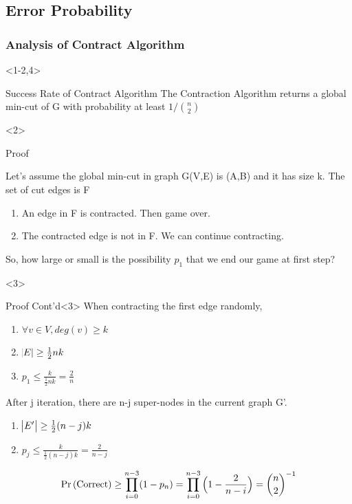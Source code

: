 \documentclass{beamer}
\begin{document}
\subsection{Error Probability}
\begin{frame}
\frametitle{Analysis of Contract Algorithm}
\begin{overlayarea}{\linewidth}{\textheight}
\begin{onlyenv}<1-2,4>
\begin{block}{Success Rate of Contract Algorithm}
The Contraction Algorithm returns a global min-cut of G with probability at least $1/\binom n2$	
\end{block}
\end{onlyenv}

\begin{onlyenv}<2>

\begin{block}{Proof}

Let's assume the global min-cut in graph G(V,E) is (A,B) and it has size k. The set of cut edges is F
\begin{enumerate}[{Case}.1]
\item An edge in F is contracted. Then game over.
\item The contracted edge is not in F. We can continue contracting.
\end{enumerate}
So, how large or small is the possibility $p_1$ that we end our game at first step? \\
\end{block}
\end{onlyenv}

\begin{onlyenv}<3>
\begin{block}{Proof Cont'd}<3>
When contracting the first edge randomly,
\begin{enumerate}
	\item $\forall v \in V, deg(v)\geq k$
	\item $\abs{E}\geq \frac{1}{2}nk$
	\item $p_1\leq \frac{k}{\frac{1}{2}nk}=\frac{2}{n}$
\end{enumerate}
After j iteration, there are n-j super-nodes in the current graph G'.
\begin{enumerate}			
	\item $\abs{E'}\geq \frac{1}{2}(n-j)k$
	\item $p_j\leq \frac{k}{\frac{1}{2}(n-j)k}=\frac{2}{n-j}$
\end{enumerate}
\begin{equation*}
\Pr\left(\text{Correct}\right)\geq \prod _{i=0}^{n-3}(1-p_n) = \prod _{i=0}^{n-3}{\Bigl (}1-{\frac {2}{n-i}}{\Bigr )}={\binom n2}^{-1}
\end{equation*}
\end{block}
\end{onlyenv}

\end{overlayarea}
\end{frame}
\end{document}
